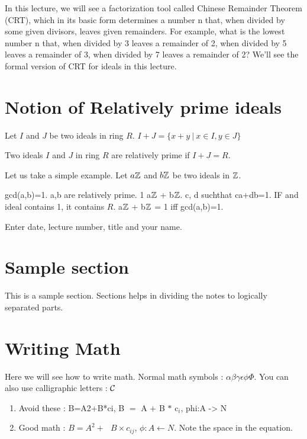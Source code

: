 In this lecture, we will see a factorization tool called Chinese Remainder Theorem (CRT), which in its basic form determines a number n that, when divided by some given divisors, leaves given remainders. For example, what is the lowest number n that, when divided by 3 leaves a remainder of 2, when divided by 5 leaves a remainder of 3, when divided by 7 leaves a remainder of 2? We'll see the formal version of CRT for ideals in this lecture.

\section{Notion of Relatively prime ideals}
Let $I$ and $J$ be two ideals in ring $R$. $I + J = \{ x + y ~|~ x \in I , y \in J \}$
\begin{definition}
Two ideals $I$ and $J$ in ring $R$ are relatively prime if  $I + J = R$.
\end{definition}

Let us take a simple example. Let $a{\mathbb{Z}}$ and $b{\mathbb{Z}}$ be two ideals in ${\mathbb{Z}}$. 

	gcd(a,b)=1.
	\implies a,b are relatively prime.
	1 \in a${\mathbb{Z}}$ +  b${\mathbb{Z}}$.
	\implies \exists c, d suchthat ca+db=1.
	IF and ideal contains 1, it contains $R$.
	a${\mathbb{Z}}$ + b${\mathbb{Z}}$ = 1 iff gcd(a,b)=1. 

\begin{note}
	Enter date, lecture number, title and your name. 
\end{note}

\section{Sample section}
This is a sample section. Sections helps in dividing the notes to logically separated parts.


\section{Writing Math}
Here we will see how to write math. Normal math symbols : 
$\alpha\beta\gamma\epsilon\phi\Phi $. You can also use calligraphic letters : ${\cal C}$
\begin{enumerate}
\item Avoid these : B=A2+B*ci, B $=$ A $+$ B $*$ c$_i$, phi:A -> N
\item Good math : $B=A^2 +~~~B \times c_{ij}$, $\phi: A \leftarrow N$. Note the space in the equation.
\end{enumerate}



